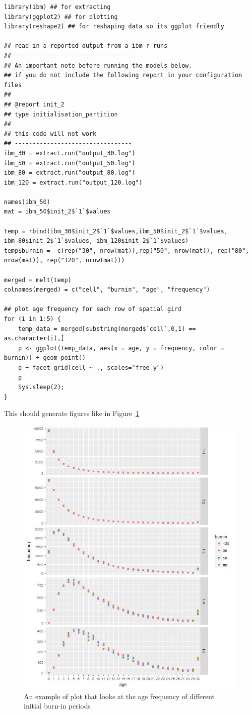 \begin{lstlisting}
library(ibm) ## for extracting
library(ggplot2) ## for plotting
library(reshape2) ## for reshaping data so its ggplot friendly

## read in a reported output from a ibm-r runs
## ---------------------------------
## An important note before running the models below.
## if you do not include the following report in your configuration files
##
## @report init_2
## type initialisation_partition
##
## this code will not work
## ---------------------------------
ibm_30 = extract.run("output_30.log")
ibm_50 = extract.run("output_50.log")
ibm_80 = extract.run("output_80.log")
ibm_120 = extract.run("output_120.log")

names(ibm_50)
mat = ibm_50$init_2$`1`$values

temp = rbind(ibm_30$init_2$`1`$values,ibm_50$init_2$`1`$values, ibm_80$init_2$`1`$values, ibm_120$init_2$`1`$values)
temp$burnin =  c(rep("30", nrow(mat)),rep("50", nrow(mat)), rep("80", nrow(mat)), rep("120", nrow(mat)))

merged = melt(temp)
colnames(merged) = c("cell", "burnin", "age", "frequency")

## plot age frequency for each row of spatial gird
for (i in 1:5) {
	temp_data = merged[substring(merged$`cell`,0,1) == as.character(i),]
	p <- ggplot(temp_data, aes(x = age, y = frequency, color = burnin)) + geom_point()
	p + facet_grid(cell ~ ., scales="free_y")
	p
    Sys.sleep(2);
}
\end{lstlisting}

This should generate figures like in Figure~\ref{fig:initial_compare}

\vspace*{3mm}
\begin{figure}[htp]
	\includegraphics[scale=0.8]{Figures/Initial_age_comp_row_1.jpg}
	\caption{An example of plot that looks at the age frequency of different initial burn-in periods}\label{fig:initial_compare}
\end{figure}
